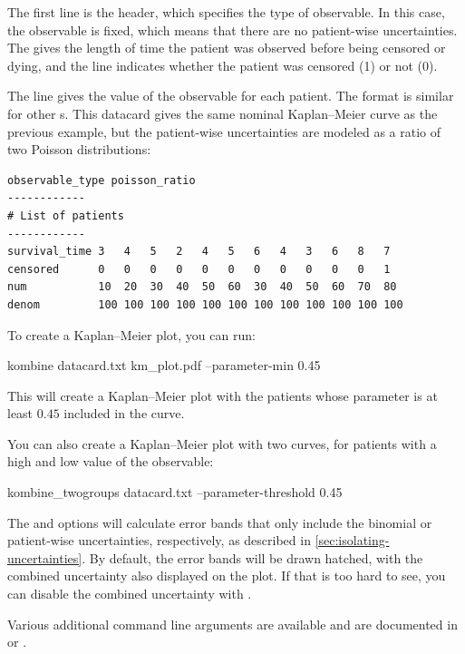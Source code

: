 \documentclass[article]{jss}
\newcommand{\KM}{Kaplan--Meier} %
\begin{document}
The first line is the header, which specifies the type of observable. In this case, the observable is fixed, which means that there are no patient-wise uncertainties. The  gives the length of time the patient was observed before being censored or dying, and the  line indicates whether the patient was censored (1) or not (0).

The  line gives the value of the observable for each patient. The format is similar for other s. This datacard gives the same nominal \KM{} curve as the previous example, but the patient-wise uncertainties are modeled as a ratio of two Poisson distributions:
\begin{verbatim}
observable_type poisson_ratio
------------
# List of patients
------------
survival_time 3   4   5   2   4   5   6   4   3   6   8   7
censored      0   0   0   0   0   0   0   0   0   0   0   1
num           10  20  30  40  50  60  30  40  50  60  70  80
denom         100 100 100 100 100 100 100 100 100 100 100 100
\end{verbatim}

To create a \KM{} plot, you can run:
\begin{CodeInput}
kombine datacard.txt km_plot.pdf --parameter-min 0.45
\end{CodeInput}
This will create a \KM{} plot with the patients whose parameter is at least \(0.45\) included in the curve.

You can also create a \KM{} plot with two curves, for patients with a high and low value of the observable:
\begin{CodeInput}
kombine_twogroups datacard.txt --parameter-threshold 0.45
\end{CodeInput}

The  and  options will calculate error bands that only include the binomial or patient-wise uncertainties, respectively, as described in \cref{sec:isolating-uncertainties}. By default, the error bands will be drawn hatched, with the combined uncertainty also displayed on the plot. If that is too hard to see, you can disable the combined uncertainty with .

Various additional command line arguments are available and are documented in  or .
\end{document}
